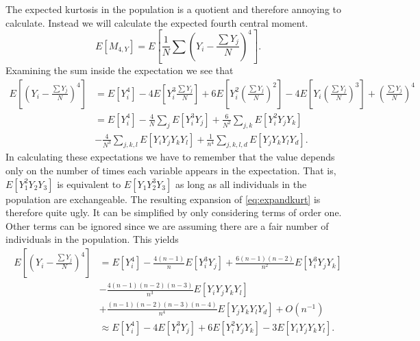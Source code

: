 The expected kurtosis in the population is a quotient and therefore annoying to
calculate. Instead we will calculate the expected fourth central moment. 
\begin{equation}
  E[M_{4,Y}] = E\left[\frac{1}{N} \sum \left( Y_i - \frac{\sum Y_j}{N} \right)^4 \right].
\end{equation}
Examining the sum inside the expectation we see that 
\begin{align}
  \label{eq:expandkurt}
  E\left[ \left( Y_i - \frac{\sum Y_j}{N} \right)^4 \right] &= E[Y_i^4] - 
                                                              4E\left[ Y_i^3 \frac{\sum Y_j}{N} \right] + 
                                                              6E\left[Y_i^2\left(\frac{\sum Y_j}{N}\right)^2\right] - 
                                                              4E\left[Y_i\left(\frac{\sum Y_j}{N}\right)^3\right]+ 
                                                              \left(\frac{\sum Y_j}{N}\right)^4 \nonumber \\
                                                            &= E[Y_i^4] - 
                                                              \frac{4}{N}\sum_j E[Y_i^3Y_j] + 
                                                              \frac{6}{N^2}\sum_{j,k} E[Y_i^2Y_jY_k] \nonumber\\
                                                              &-\frac{4}{N^3}\sum_{j,k,l}E[Y_iY_jY_kY_l] + 
                                                              \frac{1}{n^4}\sum_{j,k,l,d}E[Y_jY_kY_lY_d].
\end{align}
In calculating these expectations we have to remember that the value depends
only on the number of times each variable appears in the expectation. That is,
$E[Y_1^2Y_2Y_3]$ is equivalent to $E[Y_1Y_2^3Y_3]$ as long as all individuals in
the population are exchangeable. The resulting expansion of
\eqref{eq:expandkurt} is therefore quite ugly. It can be simplified by only
considering terms of order one. Other terms can be ignored since we are
assuming there are a fair number of individuals in the population. This yields
\begin{align}
  \label{eq:popkurt}
  E\left[ \left( Y_i - \frac{\sum Y_j}{N} \right)^4 \right] &=
  E[Y_i^4]  - \frac{4(n-1)}{n}E[Y_i^3Y_j] + \frac{6(n-1)(n-2)}{n^2}E[Y_i^3Y_jY_k]  \nonumber \\
  &- \frac{4(n-1)(n-2)(n-3)}{n^3}E[Y_iY_jY_kY_l] \nonumber \\
  &+ \frac{(n-1)(n-2)(n-3)(n-4)}{n^4}E[Y_jY_kY_lY_d]
  + O(n^{-1}) \nonumber \\
  &\approx E[Y_i^4]  - 4E[Y_i^3Y_j] + 6E[Y_i^2Y_jY_k] - 3E[Y_iY_jY_kY_l].
\end{align}

